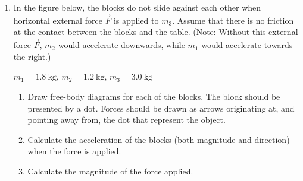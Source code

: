 \begin{enumerate}[itemsep=4pt]
\item In the figure below, the blocks do not slide against each other when
  horizontal external force $\vec F$ is applied to $m_3$. Assume that there is
  no friction at the contact between the blocks and the table. (Note: Without
  this external force $\vec F$, $m_2$ would accelerate downwards, while $m_1$
  would accelerate towards the right.)
  \begin{center}
    
    $m_1=\SI{1.8}{\kilo\gram}$, $m_2=\SI{1.2}{\kilo\gram}$,
    $m_3=\SI{3.0}{\kilo\gram}$
  \end{center}
  \begin{enumerate}[itemsep=4pt]
  \item Draw free-body diagrams for each of the blocks. The block should be
    presented by a dot. Forces should be drawn as arrows originating at, and
    pointing away from, the dot that represent the object.

  \item Calculate the acceleration of the blocks (both magnitude and direction)
    when the force is applied.
  \item Calculate the magnitude of the force applied.
  \end{enumerate}


\end{enumerate}
